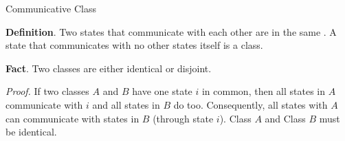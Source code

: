 \documentclass[letterpaper, mathserif]{beamer}
\begin{document}
\begin{frame}{Communicative Class}\medskip

\noindent\textbf{Definition}.
Two states that communicate with each other are in the same .
A state that communicates with no other states itself is a class.\medskip

\noindent\textbf{Fact}. Two classes are either identical or disjoint.\smallskip

{\em Proof.}
If two classes $A$ and $B$ have one state $i$ in common, then
all states in $A$ communicate with $i$ and all states in $B$ do too.
Consequently, all states with $A$ can communicate with states in $B$ (through state $i$).
Class $A$ and Class $B$ must be identical.

\begin{center}
%
%
\end{center}
\end{frame}
\end{document}
